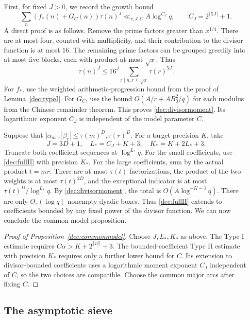 \documentclass[11pt,a4paper]{article}
\theoremstyle{paperplain}
\numberwithin{equation}{section}
\begin{document}
First, for fixed $J>0$, we record the growth bound
\begin{equation}\label{dec:divisormoment}
 \sum_n(f_*(n)+G_C(n))\tau(n)^J
 \ll_{v,J,C}A\log^{C_J}q,\qquad C_J=2^{\lceil5J\rceil}+1.
\end{equation}
A direct proof is as follows.
Remove the prime factors greater than $x^{1/4}$.
There are at most four, counted with multiplicity, and their
contribution to the divisor function is at most $16$.
The remaining prime factors can be grouped greedily into at most five
blocks, each with product at most $\sqrt x$. Thus
\[
 \tau(n)^J\le16^J\sum_{r\mid n, r\le\sqrt x}\tau(r)^{5J}.
\]
For $f_*$, use the weighted arithmetic-progression bound from the
proof of Lemma~\ref{dec:typeI}.
For $G_C$, use the bound $O(A/r+AB_0^2/q)$ for each modulus
from the Chinese remainder theorem.
This proves \eqref{dec:divisormoment}.
Its logarithmic exponent $C_J$ is independent of the model parameter $C$.

Suppose that $|\alpha_m|,|\beta_r|\le\tau(m)^D,\tau(r)^D$.
For a target precision $K$, take
\[
 J=3D+1,\quad L_*=C_J+K+3,\quad K_*=K+2L_*+3.
\]
Truncate both coefficient sequences at $\log^{L_*}q$.
For the small coefficients, use \eqref{dec:fullII} with precision $K_*$.
For the large coefficients, sum by the actual product $t=mr$.
There are at most $\tau(t)$ factorizations, the product of the two
weights is at most $\tau(t)^{2D}$, and the exceptional indicator is
at most $\tau(t)^D/\log^{L_*}q$.
By \eqref{dec:divisormoment}, the total is $O(A\log^{-K-3}q)$.
There are only $O_v(\log q)$ nonempty dyadic boxes.
Thus \eqref{dec:fullII} extends to coefficients bounded by any fixed
power of the divisor function. We can now conclude the common-model proposition.

\begin{proof}[Proof of Proposition~\ref{dec:commonmodel}]
Choose $J,L_*,K_*$ as above. The Type I estimate requires
$C\alpha>K+2^{\lceil D\rceil}+3$.
The bounded-coefficient Type II estimate with precision $K_*$
requires only a further lower bound for $C$.
Its extension to divisor-bounded coefficients uses a logarithmic
moment exponent $C_J$ independent of $C$, so the two choices are
compatible. Choose the common major arcs after fixing $C$.
\end{proof}

\subsection{The asymptotic sieve}
\label{dec:sieve}
\end{document}
